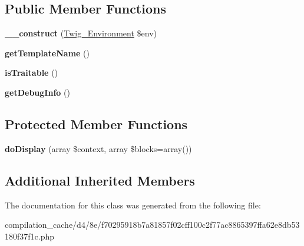 \subsection*{Public Member Functions}
\begin{DoxyCompactItemize}
\item 
\hypertarget{class_____twig_template__d48ef70295918b7a81857f02cff100c2f77ac8865397ffa62e8db53180f37f1c_a4f8326243132c1450a81e0a817aa1be7}{}{\bfseries \+\_\+\+\_\+construct} (\hyperlink{class_twig___environment}{Twig\+\_\+\+Environment} \$env)\label{class_____twig_template__d48ef70295918b7a81857f02cff100c2f77ac8865397ffa62e8db53180f37f1c_a4f8326243132c1450a81e0a817aa1be7}

\item 
\hypertarget{class_____twig_template__d48ef70295918b7a81857f02cff100c2f77ac8865397ffa62e8db53180f37f1c_a621a3ccd148ed8b9e937da6959c98f39}{}{\bfseries get\+Template\+Name} ()\label{class_____twig_template__d48ef70295918b7a81857f02cff100c2f77ac8865397ffa62e8db53180f37f1c_a621a3ccd148ed8b9e937da6959c98f39}

\item 
\hypertarget{class_____twig_template__d48ef70295918b7a81857f02cff100c2f77ac8865397ffa62e8db53180f37f1c_aa9eb89be270f6afc256ef5e272b78a63}{}{\bfseries is\+Traitable} ()\label{class_____twig_template__d48ef70295918b7a81857f02cff100c2f77ac8865397ffa62e8db53180f37f1c_aa9eb89be270f6afc256ef5e272b78a63}

\item 
\hypertarget{class_____twig_template__d48ef70295918b7a81857f02cff100c2f77ac8865397ffa62e8db53180f37f1c_abd0ecb0136f4228db2bd963bfc1e20d7}{}{\bfseries get\+Debug\+Info} ()\label{class_____twig_template__d48ef70295918b7a81857f02cff100c2f77ac8865397ffa62e8db53180f37f1c_abd0ecb0136f4228db2bd963bfc1e20d7}

\end{DoxyCompactItemize}
\subsection*{Protected Member Functions}
\begin{DoxyCompactItemize}
\item 
\hypertarget{class_____twig_template__d48ef70295918b7a81857f02cff100c2f77ac8865397ffa62e8db53180f37f1c_adb62b7c226e07d30f836ed16158d924f}{}{\bfseries do\+Display} (array \$context, array \$blocks=array())\label{class_____twig_template__d48ef70295918b7a81857f02cff100c2f77ac8865397ffa62e8db53180f37f1c_adb62b7c226e07d30f836ed16158d924f}

\end{DoxyCompactItemize}
\subsection*{Additional Inherited Members}


The documentation for this class was generated from the following file\+:\begin{DoxyCompactItemize}
\item 
compilation\+\_\+cache/d4/8e/f70295918b7a81857f02cff100c2f77ac8865397ffa62e8db53180f37f1c.\+php\end{DoxyCompactItemize}
